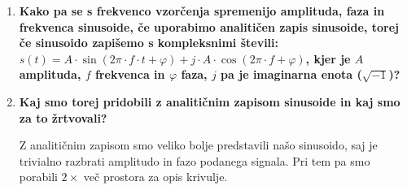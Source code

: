 \documentclass[a4paper,11pt]{article}
\begin{document}
\begin{enumerate}
 	
	\item \textbf{Kako pa se s frekvenco vzorčenja spremenijo amplituda, faza in frekvenca sinusoide, če uporabimo analitičen zapis sinusoide, torej če sinusoido zapišemo s kompleksnimi števili: $s(t) = A\cdot \sin(2\pi \cdot f \cdot t + \varphi) + j \cdot A \cdot \cos(2 \pi \cdot f + \varphi)$, kjer je $A$ amplituda, $f$ frekvenca in $\varphi$ faza, $j$ pa je imaginarna enota ($\sqrt{-1}$)?}
	
	
	\item \textbf{Kaj smo torej pridobili z analitičnim zapisom sinusoide in kaj smo za to žrtvovali?}
	
	Z analitičnim zapisom smo veliko bolje predstavili našo sinusoido, saj je trivialno razbrati amplitudo in fazo podanega signala. Pri tem pa smo porabili $2\times$ več prostora za opis krivulje.

\end{enumerate}
\end{document}
